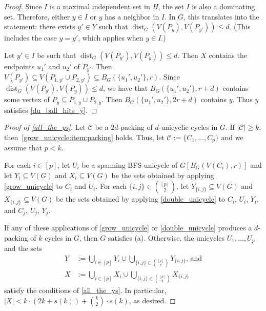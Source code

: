 \documentclass{patmorin}
\newcommand{\gwen}[1]{\textcolor{Purple}{Gwen: #1}}
\newcommand{\piotr}[1]{\textcolor{red}{Piotr: #1}}
\DeclareMathOperator{\dist}{dist}
\begin{document}
\begin{proof}
    Since $I$ is a maximal independent set in $H$, the set $I$ is also a dominating set. 
    Therefore, either $y\in I$ or $y$ has a neighbor in $I$.  In $G$, this translates into the statement: 
    there exists $y'\in Y$ such that $\dist_G(V(P_y),V(P_{y'}))\le d$.  
    (This includes the case $y=y'$, which applies when $y\in I$.)
    
    Let $y'\in I$ be such that $\dist_G(V(P_{y'}),V(P_y))\le d$.  Then $X$ contains the endpoints $u_1'$ and $u_2'$ of $P_{y'}$.  Then $V(P_{y'})\subseteq V(P_{1,y'}\cup P_{2,y'})\subseteq B_G(\{u_1',u_2'\},r)$.  Since $\dist_G(V(P_{y'}),V(P_y))\le d$, we have that  
    $B_G(\{u_1',u_2'\},r+d)$ contains some vertex of $P_y\subseteq P_{1,y}\cup P_{2,y}$. Then $B_G(\{u_1',u_2'\},2r+d)$ contains $y$.  Thus $y$ satisfies \cref{du_ball_hits_y}.
\end{proof}


\begin{proof}[Proof of \cref{all_the_ys}]
  Let $\mathcal{C}$ be a $2d$-packing of $d$-unicyclic cycles in $G$. 
  If $|\mathcal{C}|\geq k$, then~\cref{grow_unicycle:item:packing} holds.
  Thus, let $\mathcal{C}:=\{C_1,\ldots,C_p\}$ and we assume that $p<k$. 

  For each $i\in[p]$, let $U_i$ be a spanning BFS-unicycle of $G[B_G(V(C_i),r)]$ and let $Y_i\subseteq V(G)$ and $X_i\subseteq V(G)$ be the sets obtained by applying \cref{grow_unicycle} to $C_i$ and $U_i$.  For each $\{i,j\}\in \binom{[p]}{2}$, let $Y_{\{i,j\}}\subseteq V(G)$ and $X_{\{i,j\}}\subseteq V(G)$ be the sets obtained by applying \cref{double_unicycle} to $C_i$, $U_i$, $Y_i$, and $C_j$, $U_j$, $Y_j$.

  If any of these applications of \cref{grow_unicycle} or \cref{double_unicycle} produces a $d$-packing of $k$ cycles in $G$, then $G$ satisfies (a).  Otherwise, the unicycles $U_1,\ldots,U_p$ and 
  the sets 
  \begin{align*}
  Y& :=\textstyle\bigcup_{i\in[p]} Y_i\cup \bigcup_{\{i,j\}\in\binom{[p]}{2}} Y_{\{i,j\}}\text{, and} \\ X& :=\textstyle\bigcup_{i\in[p]} X_i\cup \bigcup_{\{i,j\}\in\binom{[p]}{2}} X_{\{i,j\}}
  \end{align*}
  satisfy the conditions of \cref{all_the_ys}. 
  In particular, $|X| < k\cdot(2k+s(k))+\binom{k}{2}\cdot s(k)$, as desired.
\end{proof}
\end{document}
